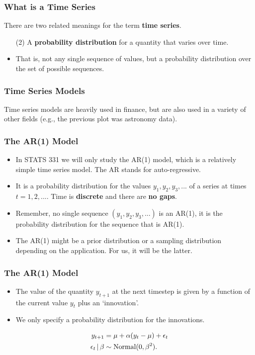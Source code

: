 \documentclass{beamer}
\newcommand{\given}{\,|\,}
\begin{document}
\begin{frame}
\frametitle{What is a Time Series}
There are two related meanings for the term {\bf time series}.

\begin{itemize}
\item [(2)] A {\bf probability distribution} for a quantity that varies over time.\pause
\item That is, not any single sequence of values,
but a probability distribution over the
set of possible sequences.
\end{itemize}

\end{frame}


\begin{frame}
\frametitle{Time Series Models}
Time series models are heavily used in finance, but are also used in a 
variety of other fields (e.g., the previous plot was astronomy data).

\end{frame}

\begin{frame}
\frametitle{The AR(1) Model}

\begin{itemize}
\item In STATS 331 we will only study the AR(1) model, which is a relatively simple
time series model. The AR stands for auto-regressive.\pause
\item It is a probability distribution for the values $y_1, y_2, y_3, ...$
of a series at times $t=1, 2, ...$.
Time is {\bf discrete} and there are {\bf no gaps}.\pause
\item Remember, no single sequence $(y_1, y_2, y_3, ...)$ is an AR(1), it is
the probability distribution for the sequence that is AR(1).\pause
\item The AR(1) might be a prior distribution or a sampling distribution
depending on the application. For us, it will be the latter.
\end{itemize}
\end{frame}

\begin{frame}
\frametitle{The AR(1) Model}

\begin{itemize}
\item The value of the quantity $y_{t+1}$ at the next timestep is given by
a function of the current value $y_{t}$ plus an `innovation'.\pause
\item We only specify a probability distribution for the innovations.\pause
\end{itemize}
\begin{align}
y_{t+1} &= \mu + \alpha(y_t - \mu) + \epsilon_t \\
\epsilon_t \given \beta &\sim \textnormal{Normal}(0, \beta^2).
\end{align}

\end{frame}
\end{document}
